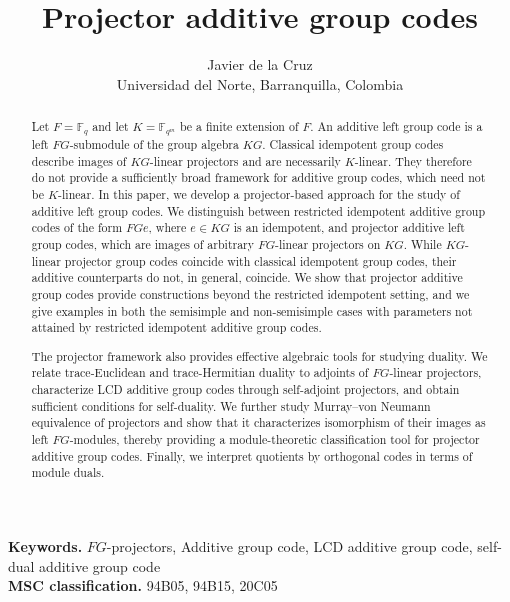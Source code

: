 \documentclass[11pt]{article}
\begin{document}
\title{Projector additive group codes}
\author{Javier de la Cruz\\Universidad del Norte, Barranquilla, Colombia}
\date{}
\maketitle
\noindent
{\bf Keywords.}  $FG$-projectors, Additive group code, LCD additive group code, self-dual additive group code\\
{\bf MSC classification.} 94B05, 94B15, 20C05

\begin{abstract}
Let $F=\mathbb{F}_q$ and let $K=\mathbb{F}_{q^m}$ be a finite extension of
$F$. An additive left group code is a left $FG$-submodule of the group
algebra $KG$. Classical idempotent group codes describe images of
$KG$-linear projectors and are necessarily $K$-linear. They therefore do not
provide a sufficiently broad framework for additive group codes, which need
not be $K$-linear. In this paper, we develop a projector-based approach for
the study of additive left group codes.
We distinguish between restricted idempotent additive group codes of the form
$FGe$, where $e\in KG$ is an idempotent, and projector additive left group
codes, which are images of arbitrary $FG$-linear projectors on $KG$. While
$KG$-linear projector group codes coincide with classical idempotent group
codes, their additive counterparts do not, in general, coincide. We show
that projector additive group codes provide constructions beyond the
restricted idempotent setting, and we give examples in both the semisimple
and non-semisimple cases with parameters not attained by restricted
idempotent additive group codes.

The projector framework also provides effective algebraic tools for studying
duality. We relate trace-Euclidean and trace-Hermitian duality to adjoints of
$FG$-linear projectors, characterize LCD additive group codes through
self-adjoint projectors, and obtain sufficient conditions for self-duality.
We further study Murray--von Neumann equivalence of projectors and show that
it characterizes isomorphism of their images as left $FG$-modules, thereby
providing a module-theoretic classification tool for projector additive group
codes. Finally, we interpret quotients by orthogonal codes in terms of module
duals.
\end{abstract}
\end{document}
